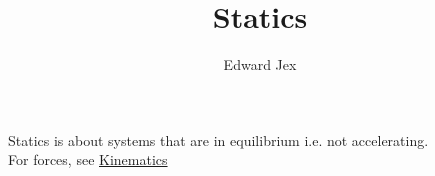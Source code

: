\documentclass[a4paper,12pt]{article}
\begin{document}
\title{Statics}	
\author{Edward Jex}
\maketitle
Statics is about systems that are in equilibrium i.e. not accelerating. \\
For forces, see \href{https://github.com/Jex-y/ALevelFurtherMathsNotes/blob/master/output/Mechanics/Kinematics.pdf}{Kinematics}
\end{document}

